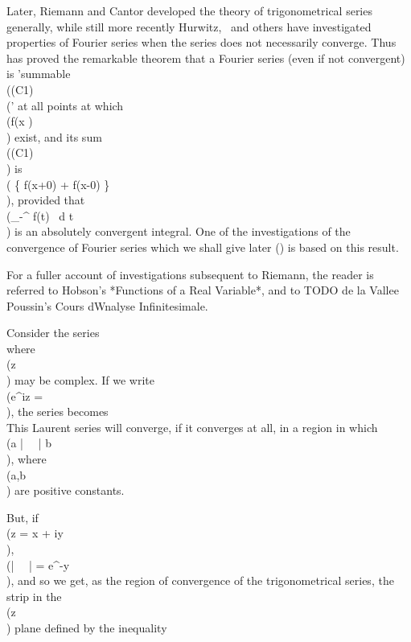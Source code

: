 Later, Riemann and Cantor developed the theory of trigonometrical
series generally, while still more recently Hurwitz, \Fejer\ and others
have investigated properties of Fourier series when the series does
not necessarily converge. Thus \Fejer has proved the remarkable
theorem that a Fourier series (even if not convergent) is 'summable
\\((C1)\\(' at all points at which \\(f(x )\\) exist, and its sum \\((C1)\\) is
\\( \left\{  f(x+0) + f(x-0)  \right\}\\),
provided that \\(\int_{-\pi}^{\pi} f(t) \, d t\\) is an absolutely convergent integral.
One of the investigations of the convergence of Fourier series which we shall give later
() is based on this result.

For a fuller account of investigations subsequent to Riemann, the
reader is referred to Hobson's *Functions of a Real Variable*, and to
TODO de la Vallee Poussin's Cours dWnalyse Infinitesimale.


Consider the series
\\[ 
\frac{1}{2} a_{0}
+
\sum_{n=1}^{\infty}
\left(
  a_{n} \cos nz
  +
  b_{n} \sin nz
\right),
\\] 
where \\(z\\) may be complex. If we write
\\(e^{iz} = \zeta\\), the series becomes
\\[ 
\frac{1}{2} a_{0}
+
\sum_{n=1}^{\infty}
\left\{ 
  \frac{1}{2} (a_{n} - i b_{n}) \zeta^{n}
  +
  \frac{1}{2} (a_{n} + i b_{n}) \zeta^{-n}
\right\}
\\] 
This Laurent series will converge, if it converges at all, in a region
in which \\(a \leq \left| \, \zeta \, \right| \leq b\\), where \\(a,b\\) are positive
constants.

But, if \\(z = x + iy\\), \\(\left| \, \zeta \, \right|  = e^{-y}\\), and so we get, as the
region of convergence of the trigonometrical series, the strip in the
\\(z\\) plane defined by the inequality
\\[ 
\log a \leq -y \leq \log b.
\\] 

